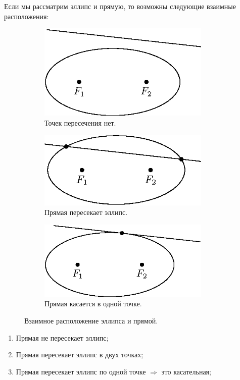 \documentclass[12pt]{article}
\theoremstyle{definition}
\begin{document}
Если мы рассматрим эллипс и прямую, то возможны следующие взаимные расположения:
\begin{figure}[H]
	\begin{subfigure}[t]{.33\textwidth}
		\centering
		\includegraphics[width=0.9\textwidth]{ANGL2_2.eps}
		\caption{Точек пересечения нет.}
		\label{2_2}
	\end{subfigure}
	\begin{subfigure}[t]{.33\textwidth}
		\centering
		\includegraphics[width=0.9\textwidth]{ANGL2_3.eps}
		\caption{Прямая пересекает эллипс.}
		\label{2_3}
	\end{subfigure}
	\begin{subfigure}[t]{.33\textwidth}
		\centering
		\includegraphics[width=0.9\textwidth]{ANGL2_4.eps}
		\caption{Прямая касается в одной точке.}
		\label{2_4}
	\end{subfigure}
	\caption{Взаимное расположение эллипса и прямой.}
\end{figure}
\begin{enumerate}[label=\arabic*)]
	\item Прямая не пересекает эллипс;
	\item Прямая пересекает эллипс в двух точках;
	\item Прямая пересекает эллипс по одной точке $\Rightarrow$ это касательная;
\end{enumerate}
\end{document}
